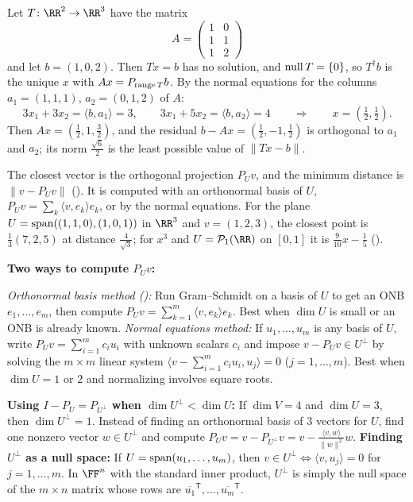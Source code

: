 \documentclass[10pt]{scrartcl}
\newcommand{\ip}[2]{\langle #1,#2\rangle}
\begin{document}
\begin{example*}
  Let $T\colon\RR^2\to\RR^3$ have the matrix
  \[ A=\begin{pmatrix}1&0\\1&1\\1&2\end{pmatrix} \]
  and let $b=(1,0,2)$. Then $Tx=b$ has no solution, and $\operatorname{null} T=\{0\}$, so $T^\dagger b$ is the unique $x$ with $Ax=P_{\operatorname{range} T}b$. By the normal equations for the columns $a_1=(1,1,1)$, $a_2=(0,1,2)$ of $A$:
  \[ 3x_1+3x_2=\ip b{a_1}=3,\qquad 3x_1+5x_2=\ip b{a_2}=4\qquad\Longrightarrow\qquad x=(\tfrac12,\tfrac12). \]
  Then $Ax=(\frac12,1,\frac32)$, and the residual $b-Ax=(\frac12,-1,\frac12)$ is orthogonal to $a_1$ and $a_2$; its norm $\frac{\sqrt6}2$ is the least possible value of $\|Tx-b\|$.
\end{example*}

\revisit The closest vector is the orthogonal projection $P_Uv$, and the minimum distance is $\|v-P_Uv\|$ (). It is computed with an orthonormal basis of $U$, $P_Uv=\sum_k\ip v{e_k}e_k$, or by the normal equations. For the plane $U=\operatorname{span}((1,1,0),(1,0,1))$ in $\RR^3$ and $v=(1,2,3)$, the closest point is $\frac13(7,2,5)$ at distance $\frac4{\sqrt3}$; for $x^3$ and $U=\PP_1(\RR)$ on $[0,1]$ it is $\frac9{10}x-\frac15$ ().

\begin{shortcuts}
  \ii \textbf{Two ways to compute $P_U v$:}
  \begin{enumerate}[(1)]
    \ii \emph{Orthonormal basis method ():} Run Gram--Schmidt on a basis of $U$ to get an ONB $e_1,\dots,e_m$, then compute $P_U v=\sum_{k=1}^m\ip v{e_k}e_k$. Best when $\dim U$ is small or an ONB is already known.
    \ii \emph{Normal equations method:} If $u_1,\dots,u_m$ is any basis of $U$, write $P_U v=\sum_{i=1}^m c_iu_i$ with unknown scalars $c_i$ and impose $v-P_U v\in U^\perp$ by solving the $m\times m$ linear system $\ip{v-\sum_{i=1}^m c_iu_i}{u_j}=0$ ($j=1,\dots,m$). Best when $\dim U=1$ or $2$ and normalizing involves square roots.
  \end{enumerate}
  \ii \textbf{Using $I-P_U=P_{U^\perp}$ when $\dim U^\perp<\dim U$:} If $\dim V=4$ and $\dim U=3$, then $\dim U^\perp=1$. Instead of finding an orthonormal basis of $3$ vectors for $U$, find one nonzero vector $w\in U^\perp$ and compute $P_U v = v - P_{U^\perp}v = v - \frac{\ip vw}{\|w\|^2}w$.
  \ii \textbf{Finding $U^\perp$ as a null space:} If $U=\operatorname{span}(u_1,\dots,u_m)$, then $v\in U^\perp\iff\ip v{u_j}=0$ for $j=1,\dots,m$. In $\FF^n$ with the standard inner product, $U^\perp$ is simply the null space of the $m\times n$ matrix whose rows are $\overline{u_1}^{\mathsf T},\dots,\overline{u_m}^{\mathsf T}$.
\end{shortcuts}
\end{document}
